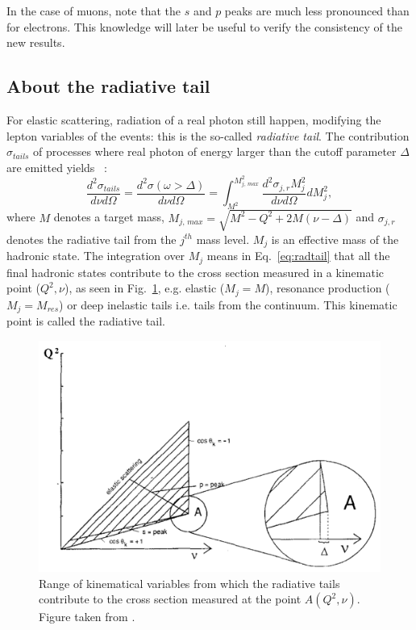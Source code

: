 In the case of muons, note that the $s$ and $p$ peaks are much less pronounced than for electrons. This knowledge will later be useful to verify the consistency of the new results.

\subsection{About the radiative tail}

For elastic scattering, radiation of a real photon still happen, modifying the lepton variables of the events: this is the so-called \textit{radiative tail}. The contribution $\sigma_{tails}$ of processes where real photon of energy larger than the cutoff parameter $\Delta$ are emitted yields \cite{TERAD2}~:
%
\begin{equation}\label{eq:radtail}
    \frac{d^2 \sigma_{tails}}{d\nu d\Omega} = \frac{d^2 \sigma(\omega > \Delta)}{d\nu d\Omega} = \int_{M^{2}}^{M^{2}_{j,\,max}} \frac{d^2 \sigma_{j,r} M^{2}_{j}}{d\nu d\Omega} dM^{2}_{j},
\end{equation}
%
where $M$ denotes a target mass, $M_{j,\,max} = \sqrt{M^2-Q^2+2M(\nu-\Delta)}$ and $\sigma_{j,r}$ denotes the radiative tail from the $j^{th}$ mass level. $M_{j}$ is an effective mass of the hadronic state. The integration over $M_j$ means in Eq.~\ref{eq:radtail} that all the final hadronic states contribute to the cross section measured in a kinematic point ($Q^2,\nu$), as seen in Fig.~\ref{fig:peaks}, e.g. elastic ($M_j=M$), resonance production ($M_j=M_{res}$) or deep inelastic tails i.e. tails from the continuum. This kinematic point is called the radiative tail.

\begin{figure}[h!]
\centering
\includegraphics[width=12cm]{gfx/peaks.png}
\caption{Range of kinematical variables from which the radiative tails contribute to the cross section
measured at the point $A(Q^2, \nu)$. Figure taken from \cite{TERAD2}.}
\label{fig:peaks}
\end{figure}



